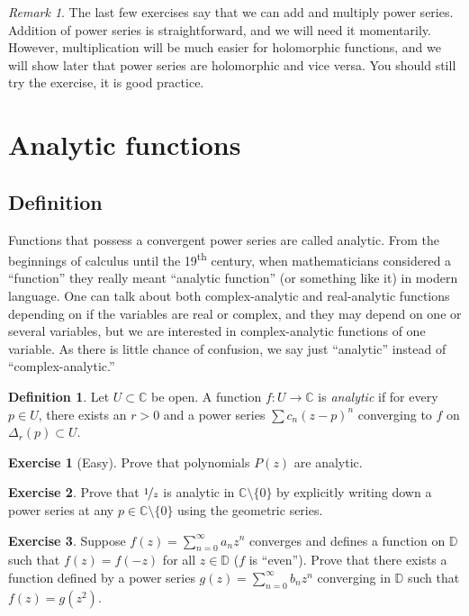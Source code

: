 \documentclass[12pt,openany]{book}
\newcommand{\C}{{\mathbb{C}}}
\newcommand{\D}{{\mathbb{D}}}
\newcommand{\myindex}[1]{#1\index{#1}}
\newcommand{\myquote}[1]{``#1''}
\theoremstyle{plain}
\theoremstyle{remark}
\newtheorem{remark}[thm]{Remark}
\theoremstyle{definition}
\newtheorem{defn}[thm]{Definition}
\newenvironment{exbox}{%
    \def\FrameCommand{\vrule width 1pt \relax\hspace{10pt}}%
    \MakeFramed{\advance\hsize-\width\FrameRestore}%
}{%
    \endMakeFramed
}
\theoremstyle{exercise}
\newtheorem{exercise}{Exercise}[section]
\theoremstyle{example}
\begin{document}
\begin{remark}
The last few exercises say that we can add and multiply power series.
Addition of power series is straightforward, and we will need it momentarily.
However, multiplication will be much easier for
holomorphic functions, and we will show later that power series are
holomorphic and vice versa.  You should still try the exercise, it is good
practice.
\end{remark}


\section{Analytic functions}
\label{sec:analfuncs}

\subsection{Definition}

Functions that possess a convergent power series are called analytic.
From the beginnings of calculus until the 19\textsuperscript{th} century, 
when mathematicians considered a \myquote{function} they really meant
\myquote{analytic function} (or something like it) in modern language.
One can talk about
both complex-analytic and real-analytic functions depending on if the
variables are real or complex, and they may depend on one or several variables,
but we are interested in complex-analytic functions of one variable. 
As there is little chance of confusion, we say just \myquote{analytic} instead of
\myquote{complex-analytic.}

\begin{defn}
Let $U \subset \C$ be open.  A function $f \colon U \to \C$
is \emph{\myindex{analytic}}
if for every $p \in U$, there exists 
an $r > 0$ and a
power series $\sum c_n {(z-p)}^n$ converging to $f$ on $\Delta_r(p) \subset
U$.
\end{defn}

\begin{exbox}
\begin{exercise}[Easy]
Prove that polynomials $P(z)$ are analytic.
\end{exercise}

\begin{exercise}
Prove that $\nicefrac{1}{z}$ is analytic in $\C \setminus \{ 0 \}$
by explicitly writing down 
a power series at any $p \in \C \setminus \{ 0 \}$
using the geometric series.
\end{exercise}

\begin{exercise}
Suppose $f(z) = \sum_{n=0}^\infty a_n z^n$ converges and defines a
function on $\D$ such that $f(z) = f(-z)$ for all $z \in \D$ ($f$ is
\myquote{even}).
Prove that there exists a function defined by a power series
$g(z) = \sum_{n=0}^\infty b_n z^n$ converging in $\D$ such that
$f(z) = g(z^2)$.
\end{exercise}
\end{exbox}
\end{document}

